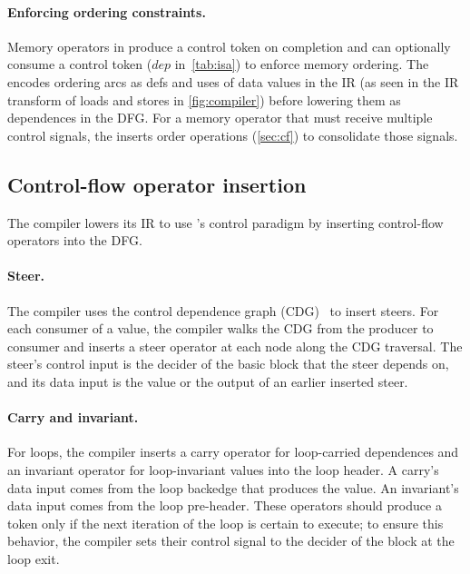 \paragraph{Enforcing ordering constraints.} 
Memory operators in \riptide 
produce a control token on completion and can optionally consume a
control token ($dep$ in~\autoref{tab:isa}) to enforce memory ordering.
%
The \mend encodes ordering arcs as defs and uses of data values in the IR
(as seen in the IR transform of loads and stores in \autoref{fig:compiler})
before lowering them as dependences in the DFG.
%
For a memory operator that must receive multiple control signals,
the \mend inserts order operations (\autoref{sec:cf}) to consolidate those signals.

\subsection{Control-flow operator insertion}

The compiler lowers its IR to use \riptide's control paradigm by inserting \riptide
control-flow operators into the DFG.
%

\paragraph{Steer.}
%
The compiler uses the control dependence graph (CDG)~\cite{cytron} to 
insert steers.
%
For each consumer of a value, the compiler walks the CDG from the producer
to consumer
and inserts a steer operator at
each node along the CDG traversal. 
%
% 
The steer's control input is the decider of the basic block that the steer depends on,
and its data input is the value or the output of an earlier inserted steer.
%

\paragraph{Carry and invariant.}
%
For loops, the compiler inserts a carry operator for loop-carried dependences
and an invariant operator for loop-invariant values
into the loop header.
%
A carry's data
input comes from the loop backedge that produces the value.  An invariant's
data input comes from the loop pre-header.
%
These operators should produce a token only if the next iteration of the loop is
certain to execute; to ensure this behavior, the compiler sets their control
signal to the decider of the block at the loop exit. 
%

